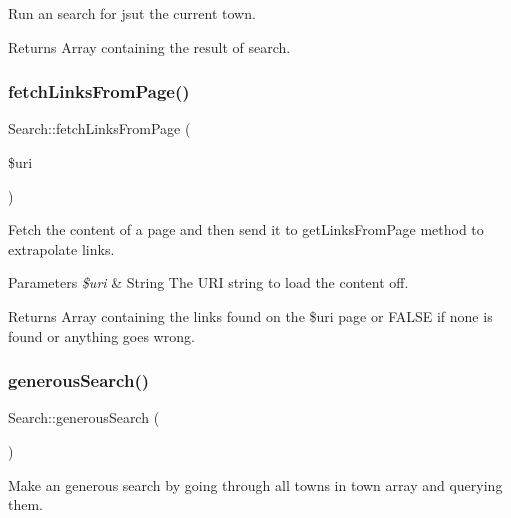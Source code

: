 Run an search for jsut the current town. 

\begin{DoxyReturn}{Returns}
Array containing the result of search. 
\end{DoxyReturn}
\hypertarget{class_search_a0ae3fdf6e8c01b665dbbfd3cb5afd82e}{}\label{class_search_a0ae3fdf6e8c01b665dbbfd3cb5afd82e} 
\subsubsection{\texorpdfstring{fetch\+Links\+From\+Page()}{fetchLinksFromPage()}}
{\footnotesize\ttfamily Search\+::fetch\+Links\+From\+Page (\begin{DoxyParamCaption}\item[{}]{\$uri }\end{DoxyParamCaption})\hspace{0.3cm}{\ttfamily [private]}}



Fetch the content of a page and then send it to get\+Links\+From\+Page method to extrapolate links. 


\begin{DoxyParams}{Parameters}
{\em \$uri} & String The U\+RI string to load the content off. \\
\hline
\end{DoxyParams}
\begin{DoxyReturn}{Returns}
Array containing the links found on the \$uri page or F\+A\+L\+SE if none is found or anything goes wrong. 
\end{DoxyReturn}
\hypertarget{class_search_ac7ab4b286f468dbc67184e3d8e2ec086}{}\label{class_search_ac7ab4b286f468dbc67184e3d8e2ec086} 
\subsubsection{\texorpdfstring{generous\+Search()}{generousSearch()}}
{\footnotesize\ttfamily Search\+::generous\+Search (\begin{DoxyParamCaption}{ }\end{DoxyParamCaption})\hspace{0.3cm}{\ttfamily [private]}}



Make an generous search by going through all towns in town array and querying them. 

